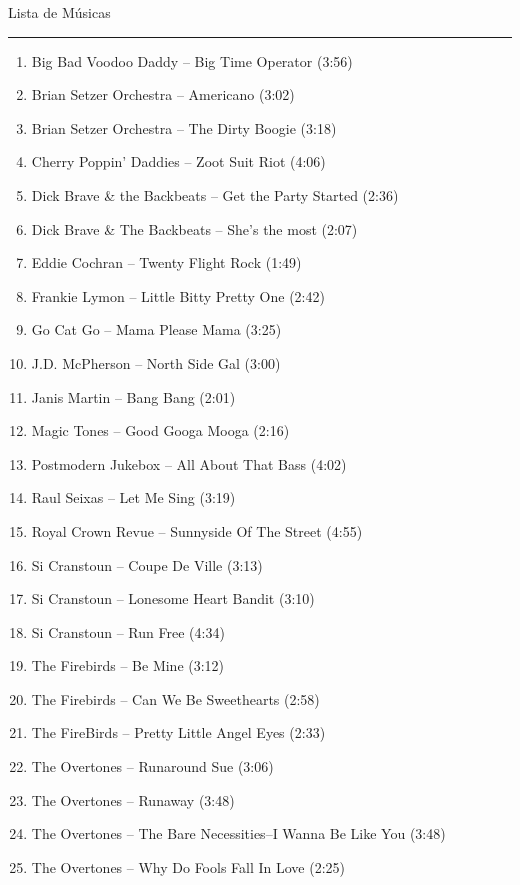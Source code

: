 \documentclass{article}
\begin{document}
\begin{minipage}[t][0.95\textheight][t]{0.5\textwidth}
    \centering
    \vspace{0.1cm}
    {\Large Lista de Músicas}\\
    \rule{\textwidth}{1pt}
    \scriptsize
    \begin{enumerate}
        \setlength\itemsep{1mm}
        \item Big Bad Voodoo Daddy -- Big Time Operator (3:56)
        \item Brian Setzer Orchestra -- Americano (3:02)
        \item Brian Setzer Orchestra -- The Dirty Boogie (3:18)
        \item Cherry Poppin' Daddies -- Zoot Suit Riot (4:06)
        \item Dick Brave \& the Backbeats -- Get the Party Started (2:36)
        \item Dick Brave \& The Backbeats -- She's the most (2:07)
        \item Eddie Cochran -- Twenty Flight Rock (1:49)
        \item Frankie Lymon -- Little Bitty Pretty One (2:42)
        \item Go Cat Go -- Mama Please Mama (3:25)
        \item J.D. McPherson -- North Side Gal (3:00)
        \item Janis Martin -- Bang Bang (2:01)
        \item Magic Tones -- Good Googa Mooga (2:16)
        \item Postmodern Jukebox -- All About That Bass (4:02)
        \item Raul Seixas -- Let Me Sing (3:19)
        \item Royal Crown Revue -- Sunnyside Of The Street (4:55)
        \item Si Cranstoun -- Coupe De Ville (3:13)
        \item Si Cranstoun -- Lonesome Heart Bandit (3:10)
        \item Si Cranstoun -- Run Free (4:34)
        \item The Firebirds -- Be Mine (3:12)
        \item The Firebirds -- Can We Be Sweethearts (2:58)
        \item The FireBirds -- Pretty Little Angel Eyes (2:33)
        \item The Overtones -- Runaround Sue (3:06)
        \item The Overtones -- Runaway (3:48)
        \item The Overtones -- The Bare Necessities--I Wanna Be Like You (3:48)
        \item The Overtones -- Why Do Fools Fall In Love (2:25)
    \end{enumerate}
\end{minipage}
\end{document}
